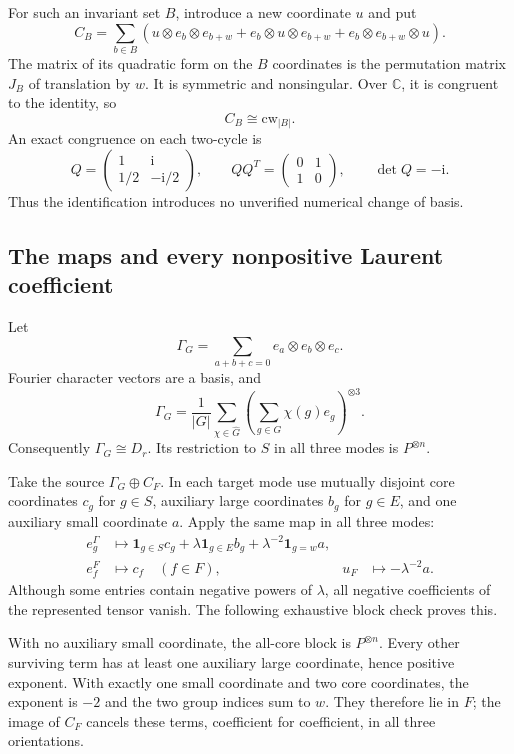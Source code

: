 \documentclass[11pt]{article}
\theoremstyle{definition}\newtheorem{definition}[theorem]{Definition}
\newcommand{\C}{\mathbb C}
\newcommand{\cw}{\mathrm{cw}}
\begin{document}
For such an invariant set $B$, introduce a new coordinate $u$ and put
\begin{equation}\label{eq:paired}
C_B=\sum_{b\in B}\left(
 u\otimes e_b\otimes e_{b+w}
+e_b\otimes u\otimes e_{b+w}
+e_b\otimes e_{b+w}\otimes u\right).
\end{equation}
The matrix of its quadratic form on the $B$ coordinates is the permutation matrix $J_B$ of translation by $w$. It is symmetric and nonsingular. Over $\C$, it is congruent to the identity, so
\begin{equation}\label{eq:paired-cw}
C_B\cong\cw_{|B|}.
\end{equation}
An exact congruence on each two-cycle is
\[
Q=\begin{pmatrix}1&\mathrm i\\[1pt]1/2&-\mathrm i/2\end{pmatrix},
\qquad QQ^T=\begin{pmatrix}0&1\\1&0\end{pmatrix},\qquad \det Q=-\mathrm i.
\]
Thus the identification introduces no unverified numerical change of basis.

\subsection{The maps and every nonpositive Laurent coefficient}
Let
\[
\Gamma_G=\sum_{a+b+c=0}e_a\otimes e_b\otimes e_c.
\]
Fourier character vectors are a basis, and
\[
\Gamma_G=\frac1{|G|}\sum_{\chi\in\widehat G}
\left(\sum_{g\in G}\chi(g)e_g\right)^{\otimes3}.
\]
Consequently $\Gamma_G\cong D_r$. Its restriction to $S$ in all three modes is $P^{\otimes n}$.

Take the source $\Gamma_G\oplus C_F$. In each target mode use mutually disjoint core coordinates $c_g$ for $g\in S$, auxiliary large coordinates $b_g$ for $g\in E$, and one auxiliary small coordinate $a$. Apply the same map in all three modes:
\begin{align}
 e_g^{\Gamma}&\longmapsto
 \mathbf1_{g\in S}c_g+\lambda\mathbf1_{g\in E}b_g
 +\lambda^{-2}\mathbf1_{g=w}a,\label{eq:maps1}\\
 e_f^F&\longmapsto c_f\quad(f\in F),
 &u_F&\longmapsto-\lambda^{-2}a.\label{eq:maps2}
\end{align}
Although some entries contain negative powers of $\lambda$, all negative coefficients of the represented tensor vanish. The following exhaustive block check proves this.

With no auxiliary small coordinate, the all-core block is $P^{\otimes n}$. Every other surviving term has at least one auxiliary large coordinate, hence positive exponent. With exactly one small coordinate and two core coordinates, the exponent is $-2$ and the two group indices sum to $w$. They therefore lie in $F$; the image of $C_F$ cancels these terms, coefficient for coefficient, in all three orientations.
\end{document}

